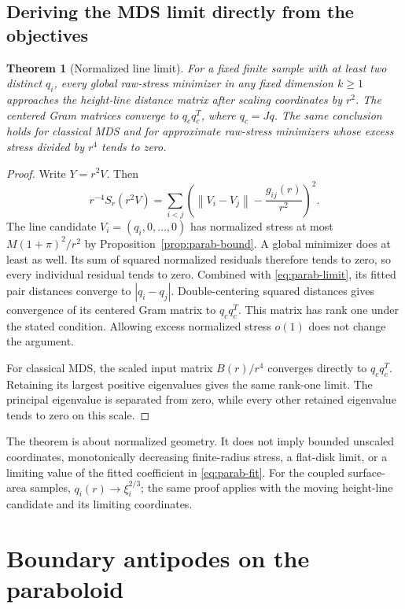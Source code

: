 \documentclass[11pt]{article}
\newtheorem{theorem}[proposition]{Theorem}
\theoremstyle{remark}\newtheorem{remark}[proposition]{Remark}
\newcommand{\norm}[1]{\left\lVert#1\right\rVert}
\begin{document}
\subsection{Deriving the MDS limit directly from the objectives}
\begin{theorem}[Normalized line limit]\label{thm:line}
For a fixed finite sample with at least two distinct $q_i$, every global
raw-stress minimizer in any fixed dimension $k\ge1$ approaches the height-line
distance matrix after scaling coordinates by $r^2$. The centered Gram matrices
converge to $q_cq_c^T$, where $q_c=Jq$. The same conclusion holds for classical
MDS and for approximate raw-stress minimizers whose excess stress divided by
$r^4$ tends to zero.
\end{theorem}
\begin{proof}
Write $Y=r^2V$. Then
\begin{equation}\label{eq:rescaled-stress}
 r^{-4}S_r(r^2V)=\sum_{i<j}
 \left(\norm{V_i-V_j}-\frac{g_{ij}(r)}{r^2}\right)^2.
\end{equation}
The line candidate $V_i=(q_i,0,\ldots,0)$ has normalized stress at most
$M(1+\pi)^2/r^2$ by Proposition~\ref{prop:parab-bound}. A global minimizer does
at least as well. Its sum of squared normalized residuals therefore tends to
zero, so every individual residual tends to zero. Combined with
\eqref{eq:parab-limit}, its fitted pair distances converge to $|q_i-q_j|$.
Double-centering squared distances gives convergence of its centered Gram
matrix to $q_cq_c^T$. This matrix has rank one under the stated condition.
Allowing excess normalized stress $o(1)$ does not change the argument.

For classical MDS, the scaled input matrix $B(r)/r^4$ converges directly to
$q_cq_c^T$. Retaining its largest positive eigenvalues gives the same rank-one
limit. The principal eigenvalue is separated from zero, while every other
retained eigenvalue tends to zero on this scale.
\end{proof}

The theorem is about normalized geometry. It does not imply bounded unscaled
coordinates, monotonically decreasing finite-radius stress, a flat-disk limit,
or a limiting value of the fitted coefficient in \eqref{eq:parab-fit}.
For the coupled surface-area samples, $q_i(r)\to \xi_i^{2/3}$; the same proof
applies with the moving height-line candidate and its limiting coordinates.

\section{Boundary antipodes on the paraboloid}\label{sec:antipodal}
\end{document}

